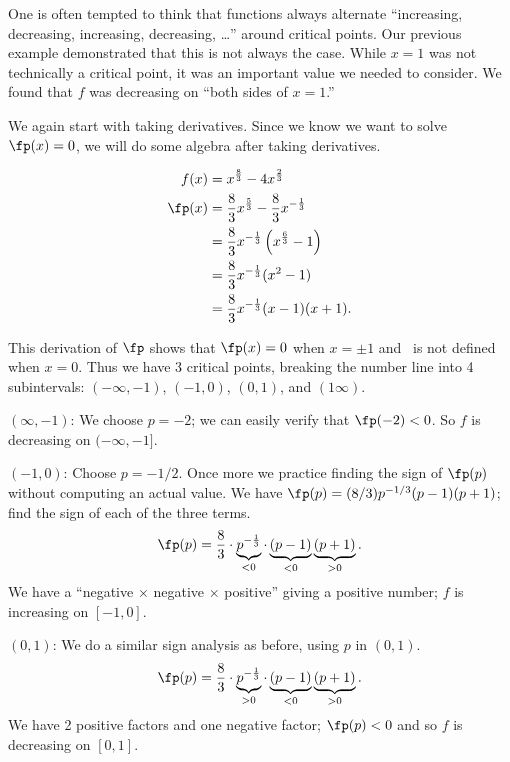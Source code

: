 One is often tempted to think that functions always alternate ``increasing, decreasing, increasing, decreasing, \dots'' around critical points. Our previous example demonstrated that this is not always the case. While $x=1$ was not technically a critical point, it was an important value we needed to consider. We found that $f$ was decreasing on ``both sides of $x=1$.''

{We again start with taking derivatives. Since we know we want to solve $\fp(x) = 0$, we will do some algebra after taking derivatives.

\begin{align*}
f(x) &= x^{\frac{8}{3}}-4x^{\frac{2}{3}} \\
\fp(x) &= \frac83 x^{\frac53} - \frac83x^{-\frac13}\\
	&= \frac83x^{-\frac13}\left(x^{\frac63}-1\right)\\
	&=\frac83x^{-\frac13}(x^2-1)\\
	&=\frac83x^{-\frac13}(x-1)(x+1).
\end{align*}

This derivation of $\fp$ shows that $\fp(x) = 0$ when $x=\pm 1$ and \fp\ is not defined when $x=0$. Thus we have 3 critical points, breaking the number line into 4 subintervals: $(-\infty,-1)$, $(-1,0)$, $(0,1)$, and $(1\infty)$.

\iflatexml\begin{description}\else\begin{description}[leftmargin=0pt]\fi
\item[Interval 1,] $(\infty,-1)$: We choose $p=-2$; we can easily verify that $\fp(-2)<0$. So $f$ is decreasing on $(-\infty,-1]$.

\item[Interval 2,] $(-1,0)$: Choose $p=-1/2$. Once more we practice finding the sign of $\fp(p)$ without computing an actual value. We have $\fp(p) = (8/3)p^{-1/3}(p-1)(p+1)$; find the sign of each of the three terms. 
	\[\fp(p) = \frac 83 \cdot \underbrace{p^{-\frac13}}_{<0}\cdot \underbrace{(p-1)}_{<0}\underbrace{(p+1)}_{>0}.\]
	We have a ``negative $\times$ negative $\times$ positive'' giving a positive number; $f$ is increasing on $[-1,0]$.

\item[Interval 3,] $(0,1)$: We do a similar sign analysis as before, using $p$ in $(0,1)$.
	\[\fp(p) = \frac 83 \cdot \underbrace{p^{-\frac13}}_{>0}\cdot \underbrace{(p-1)}_{<0}\underbrace{(p+1)}_{>0}.\]
	We have 2 positive factors and one negative factor; $\fp(p)<0$ and so $f$ is decreasing on $[0,1]$.


\end{description}
\end{description}}
